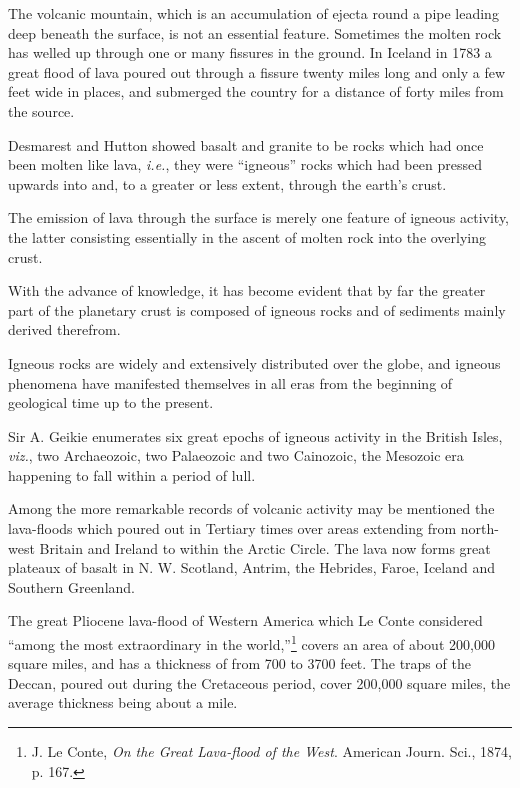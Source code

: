 \documentclass[a4paper, 12pt, oneside, landscape]{article}
\begin{document}
The volcanic mountain, which is an accumulation of ejecta round a pipe leading deep beneath the surface, is not an essential feature. Sometimes the molten rock has welled up through one or many fissures in the ground. In Iceland in 1783 a great flood of lava poured out through a fissure twenty miles long and only a few feet wide in places, and submerged the country for a distance of forty miles from the source.

Desmarest and Hutton showed basalt and granite to be rocks which had once been molten like lava, \emph{i.e.}, they were ``igneous'' rocks which had been pressed upwards into and, to a greater or less extent, through the earth's crust.

The emission of lava through the surface is merely one feature of igneous activity, the latter consisting essentially in the ascent of molten rock into the overlying crust.

With the advance of knowledge, it has become evident that by far the greater part of the planetary crust is composed of igneous rocks and of sediments mainly derived therefrom.

Igneous rocks are widely and extensively distributed over the globe, and igneous phenomena have manifested themselves in all eras from the beginning of geological time up to the present.

Sir A. Geikie enumerates six great epochs of igneous activity in the British Isles, \emph{viz.}, two Archaeozoic, two Palaeozoic and two Cainozoic, the Mesozoic era happening to fall within a period of lull.

Among the more remarkable records of volcanic activity may be mentioned the lava-floods which poured out in Tertiary times over areas extending from north-west Britain and Ireland to within the Arctic Circle. The lava now forms great plateaux of basalt in N. W. Scotland, Antrim, the Hebrides, Faroe, Iceland and Southern Greenland.

The great Pliocene lava-flood of Western America which Le Conte considered ``among the most extraordinary in the world,''\footnote{J. Le Conte, \emph{On the Great Lava-flood of the West}. American Journ. Sci., 1874, p. 167.} covers an area of about 200,000 square miles, and has a thickness of from 700 to 3700 feet. The traps of the Deccan, poured out during the Cretaceous period, cover 200,000 square miles, the average thickness being about a mile.
\end{document}
